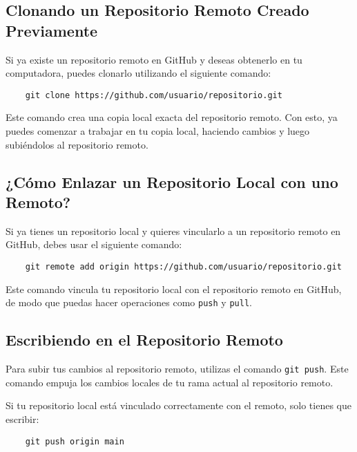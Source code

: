     \subsection{Clonando un Repositorio Remoto Creado Previamente}

        Si ya existe un repositorio remoto en GitHub y deseas obtenerlo en tu computadora, puedes clonarlo utilizando el siguiente comando:

        \begin{lstlisting}
    git clone https://github.com/usuario/repositorio.git
        \end{lstlisting}

        Este comando crea una copia local exacta del repositorio remoto. Con esto, ya puedes comenzar a trabajar en tu copia local, haciendo cambios y luego subi\'endolos al repositorio remoto.



    \subsection{¿C\'omo Enlazar un Repositorio Local con uno Remoto?}

        Si ya tienes un repositorio local y quieres vincularlo a un repositorio remoto en GitHub, debes usar el siguiente comando:

        \begin{lstlisting}
    git remote add origin https://github.com/usuario/repositorio.git
        \end{lstlisting}

        Este comando vincula tu repositorio local con el repositorio remoto en GitHub, de modo que puedas hacer operaciones como \texttt{push} y \texttt{pull}.



    \subsection{Escribiendo en el Repositorio Remoto}

        Para subir tus cambios al repositorio remoto, utilizas el comando \texttt{git push}. Este comando empuja los cambios locales de tu rama actual al repositorio remoto.

        Si tu repositorio local est\'a vinculado correctamente con el remoto, solo tienes que escribir:

        \begin{lstlisting}
    git push origin main
        \end{lstlisting}

